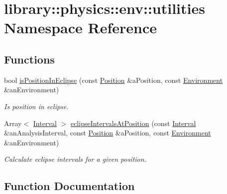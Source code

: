 \hypertarget{namespacelibrary_1_1physics_1_1env_1_1utilities}{}\section{library\+:\+:physics\+:\+:env\+:\+:utilities Namespace Reference}
\label{namespacelibrary_1_1physics_1_1env_1_1utilities}
\subsection*{Functions}
\begin{DoxyCompactItemize}
\item 
bool \hyperlink{namespacelibrary_1_1physics_1_1env_1_1utilities_a8e0f4d40a34e939f9ba87c3f52e36765}{is\+Position\+In\+Eclipse} (const \hyperlink{classlibrary_1_1physics_1_1coord_1_1_position}{Position} \&a\+Position, const \hyperlink{classlibrary_1_1physics_1_1_environment}{Environment} \&an\+Environment)
\begin{DoxyCompactList}\small\item\em Is position in eclipse. \end{DoxyCompactList}\item 
Array$<$ \hyperlink{classlibrary_1_1physics_1_1time_1_1_interval}{Interval} $>$ \hyperlink{namespacelibrary_1_1physics_1_1env_1_1utilities_ae138a495bc66b6c3ff4dc5e899ca1587}{eclipse\+Intervals\+At\+Position} (const \hyperlink{classlibrary_1_1physics_1_1time_1_1_interval}{Interval} \&an\+Analysis\+Interval, const \hyperlink{classlibrary_1_1physics_1_1coord_1_1_position}{Position} \&a\+Position, const \hyperlink{classlibrary_1_1physics_1_1_environment}{Environment} \&an\+Environment)
\begin{DoxyCompactList}\small\item\em Calculate eclipse intervals for a given position. \end{DoxyCompactList}\end{DoxyCompactItemize}


\subsection{Function Documentation}
\mbox{\label{namespacelibrary_1_1physics_1_1env_1_1utilities_ae138a495bc66b6c3ff4dc5e899ca1587}} 
